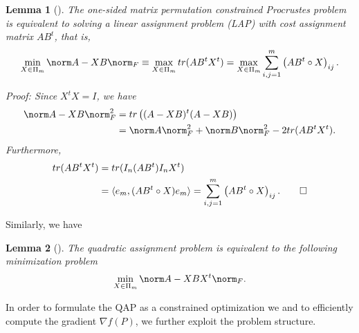 \documentclass{amsart}
\theoremstyle{plain} \newtheorem{Exa}{Example}[section]
\newtheorem{Lem}{Lemma}[section]
\begin{document}
\begin{Lem}[]
The one-sided matrix permutation constrained Procrustes problem is equivalent to solving a linear assignment problem (LAP)
with cost assignment matrix $AB^t$, that is,
$$
\min_{X \in \Pi_m} \norm A-XB \norm_F
\equiv
\max_{X \in \Pi_m} tr( AB^t X^t )
= \max_{X \in \Pi_m}
\sum_{i,j=1}^m \left({ AB^t \circ X }\right)_{ij} .
\label{ LAPequiv}
$$

Proof:
Since $X^t X = I$, we have
$$ \aligned
\norm A-XB \norm^2_F &= tr \left({ (A-XB)^t (A-XB) }\right) \\
&= \norm A \norm^2_F + \norm B \norm^2_F -2 tr( AB^t X^t ).
\endaligned
$$ Furthermore, $$ \aligned tr( AB^t X^t ) &= tr( I_n (AB^t)
I_n X^t ) \\ &= \langle e_m, (AB^t \circ X ) e_m \rangle =
\sum_{i,j=1}^m \left({ AB^t \circ X }\right)_{ij} . \qed
\endaligned
$$
\end{Lem}

Similarly, we have
\begin{Lem}[]
The quadratic assignment problem is equivalent to the following minimization problem
$$\min_{X \in \Pi_m} \norm A-XBX^{t} \norm_F . $$

\end{Lem}

In order to formulate the QAP as a constrained optimization we 
and to efficiently compute the gradient
$\nabla f(P)$, we further exploit the problem structure.
\end{document}
